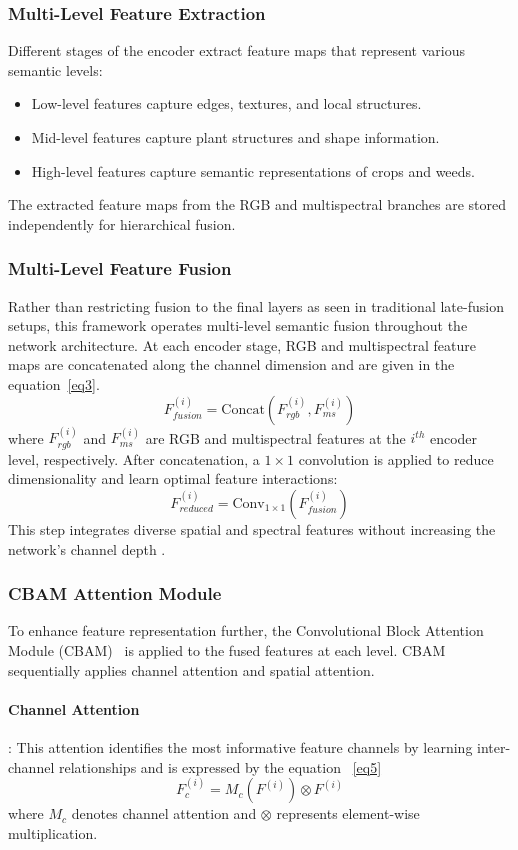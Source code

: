 \documentclass[pdflatex,sn-mathphys-num]{sn-jnl}
\begin{document}
\subsubsection{Multi-Level Feature Extraction}
Different stages of the encoder extract feature maps that represent various semantic levels:
\begin{itemize}
    \item Low-level features capture edges, textures, and local structures.
    \item Mid-level features capture plant structures and shape information.
    \item High-level features capture semantic representations of crops and weeds.
\end{itemize}
The extracted feature maps from the RGB and multispectral branches are stored independently for hierarchical fusion.
\subsubsection{Multi-Level Feature Fusion}
Rather than restricting fusion to the final layers as seen in traditional late-fusion setups, this framework operates multi-level semantic fusion throughout the network architecture. At each encoder stage, RGB and multispectral feature maps are concatenated along the channel dimension and are given in the equation~\ref{eq3}. 
\begin{equation}
F_{fusion}^{(i)} = \text{Concat}(F_{rgb}^{(i)}, F_{ms}^{(i)})\label{eq3}
\end{equation}
where $F_{rgb}^{(i)}$ and $F_{ms}^{(i)}$ are RGB and multispectral features at the $i^{th}$ encoder level, respectively. After concatenation, a $1\times1$ convolution is applied to reduce dimensionality and learn optimal feature interactions:
\begin{equation}
F_{reduced}^{(i)} = \text{Conv}_{1\times1}(F_{fusion}^{(i)})
\end{equation}
This step integrates diverse spatial and spectral features without increasing the network's channel depth \cite{lin2017fpn}.
\subsubsection{CBAM Attention Module}
To enhance feature representation further, the Convolutional Block Attention Module (CBAM)~\cite{woo2018cbam} is applied to the fused features at each level. CBAM sequentially applies channel attention and spatial attention.
\paragraph{Channel Attention}: This attention identifies the most informative feature channels by learning inter-channel relationships and is expressed by the equation ~\ref{eq5}
\begin{equation}
F_{c}^{(i)} = M_c(F^{(i)}) \otimes F^{(i)}\label{eq5}
\end{equation}
where $M_c$ denotes channel attention and $\otimes$ represents element-wise multiplication.
\end{document}
